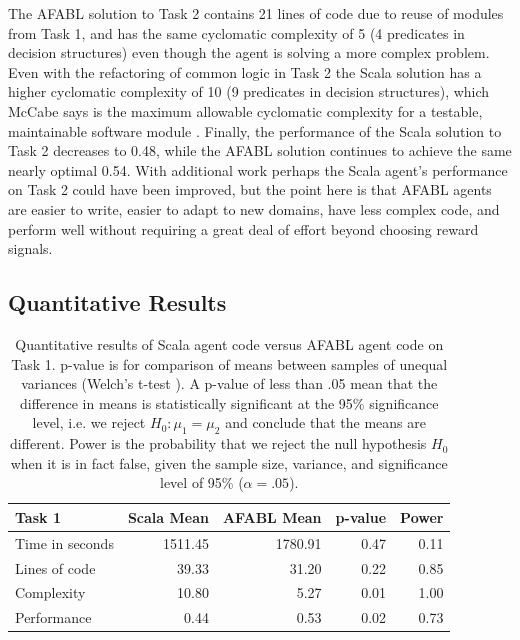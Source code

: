 The AFABL solution to Task 2 contains 21 lines of code due to reuse of modules from Task 1, and has the same cyclomatic complexity of 5 (4 predicates in decision structures) even though the agent is solving a more complex problem. Even with the refactoring of common logic in Task 2 the Scala solution has a higher cyclomatic complexity of 10 (9 predicates in decision structures), which McCabe says is the maximum allowable cyclomatic complexity for a testable, maintainable software module \cite{mccabe1976complexity}. Finally, the performance of the Scala solution to Task 2 decreases to 0.48, while the AFABL solution continues to achieve the same nearly optimal 0.54. With additional work perhaps the Scala agent's performance on Task 2 could have been improved, but the point here is that AFABL agents are easier to write, easier to adapt to new domains, have less complex code, and perform well without requiring a great deal of effort beyond choosing reward signals.

\subsection{Quantitative Results}

\begin{center}
\begin{table}[h]
\caption{Quantitative results of Scala agent code versus AFABL agent code on Task 1. p-value is for comparison of means between samples of unequal variances (Welch's t-test \cite{welch1947generalization}). A p-value of less than .05 mean that the difference in means is statistically significant at the 95\% significance level, i.e. we reject $H_0: \mu_1 = \mu_2$ and conclude that the means are different. Power is the probability that we reject the null hypothesis $H_0$ when it is in fact false, given the sample size, variance, and significance level of 95\% ($\alpha = .05$).}
\label{tbl:task1-results}

\begin{center}
\begin{tabular}{|l|r|r|r|r|}\hline
Task 1 & Scala Mean & AFABL Mean & p-value & Power \\\hline
Time in seconds & 1511.45 & 1780.91 & 0.47 & 0.11\\
Lines of code & 39.33 & 31.20 & 0.22 & 0.85\\
Complexity & 10.80 & 5.27 & 0.01 & 1.00\\
Performance & 0.44 & 0.53 & 0.02 & 0.73\\
\hline
\end{tabular}

\end{center}
\end{table}
\end{center}


